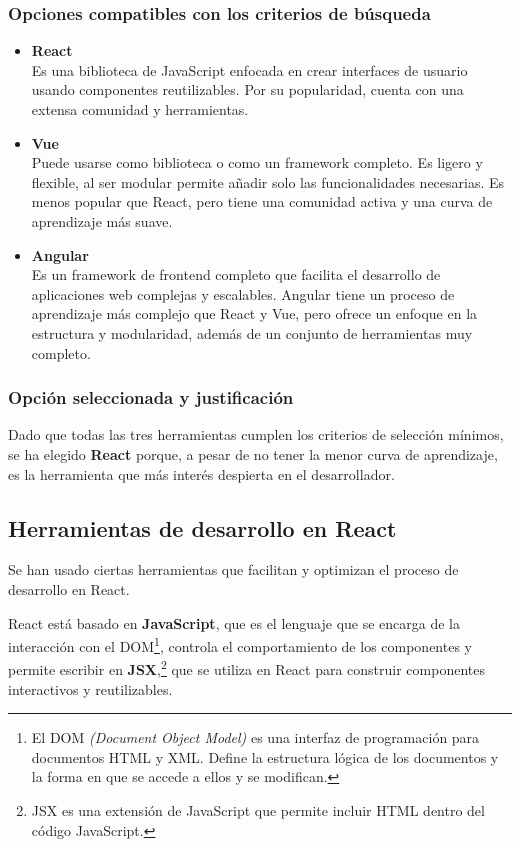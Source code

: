 \subsubsection{Opciones compatibles con los criterios de búsqueda}
\begin{itemize}
    \item \textbf{React}\\
        Es una biblioteca de JavaScript enfocada en crear interfaces de usuario usando componentes reutilizables. Por su popularidad, cuenta con una extensa comunidad y herramientas.
    \item \textbf{Vue}\\
        Puede usarse como biblioteca o como un framework completo. Es ligero y flexible, al ser modular permite añadir solo las funcionalidades necesarias. Es menos popular que React, pero tiene una comunidad activa y una curva de aprendizaje más suave.
    \item \textbf{Angular}\\
        Es un framework de frontend completo que facilita el desarrollo de aplicaciones web complejas y escalables. Angular tiene un proceso de aprendizaje más complejo que React y Vue, pero ofrece un enfoque en la estructura y modularidad, además de un conjunto de herramientas muy completo.
\end{itemize}

\subsubsection{Opción seleccionada y justificación}
Dado que todas las tres herramientas cumplen los criterios de selección mínimos, se ha elegido \textbf{React} porque, a pesar de no tener la menor curva de aprendizaje, es la herramienta que más interés despierta en el desarrollador\cite{banks2020learning}.

\subsection{Herramientas de desarrollo en React}
Se han usado ciertas herramientas que facilitan y optimizan el proceso de desarrollo en React.

React está basado en \textbf{JavaScript}, que es el lenguaje que se encarga de la interacción con el DOM\footnote{ El DOM \textit{(Document Object Model)} es una interfaz de programación para documentos HTML y XML. Define la estructura lógica de los documentos y la forma en que se accede a ellos y se modifican.}, controla el comportamiento de los componentes y permite escribir en \textbf{JSX},\footnote{JSX es una extensión de JavaScript que permite incluir HTML dentro del código JavaScript.} que se utiliza en React para construir componentes interactivos y reutilizables.

